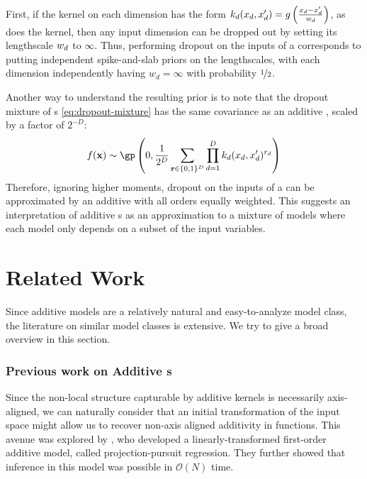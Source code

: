 First, if the kernel on each dimension has the form ${k_d(x_d, x_d') = g \left( \frac{x_d - x_d'}{w_d} \right)}$, as does the \kSE{} kernel, then any input dimension can be dropped out by setting its lengthscale $w_d$ to $\infty$.
Thus, performing dropout on the inputs of a \gp{} corresponds to putting independent spike-and-slab priors on the lengthscales, with each dimension independently having $w_d = \infty$ with probability $\nicefrac{1}{2}$.

Another way to understand the resulting prior is to note that the dropout mixture of \gp{}s \eqref{eq:dropout-mixture} has the same covariance as an additive \gp{}, scaled by a factor of $2^{-D}$:
\begin{align}
f(\vx) \sim \textnormal{\gp} \left(0, \frac{1}{2^{D}} \sum_{\vr \in \{0,1\}^D}  \prod_{d=1}^D k_d(x_d, x_d')^{r_d} \right)
\label{eq:additive-gps}
\end{align}
%
Therefore, ignoring higher moments, dropout on the inputs of a \gp{} can be approximated by an additive \gp{} with all orders equally weighted.
This suggests an interpretation of additive \gp{}s as an approximation to a mixture of models where each model only depends on a subset of the input variables.





\section{Related Work}

Since additive models are a relatively natural and easy-to-analyze model class, the literature on similar model classes is extensive.
We try to give a broad overview in this section.

\subsubsection{Previous work on Additive \sgp{}s}

Since the non-local structure capturable by additive kernels is necessarily axis-aligned, we can naturally consider that an initial transformation of the input space might allow us to recover non-axis aligned additivity in functions.
This avenue was explored by \citet{gilboa2013scaling}, who developed a linearly-transformed first-order additive \gp{} model, called projection-pursuit \gp{} regression.  They further showed that inference in this model was possible in $\mathcal{O}(N)$ time.

